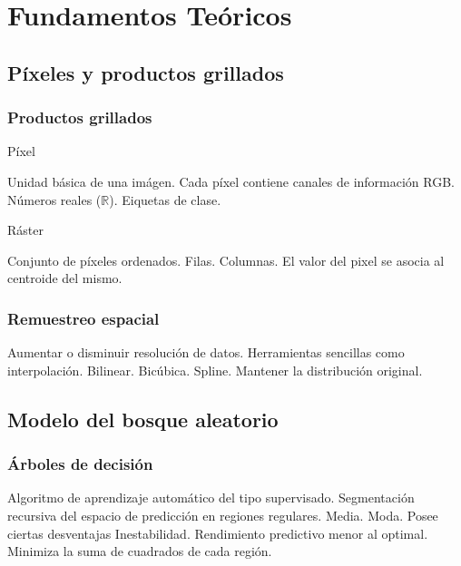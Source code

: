 \documentclass{beamer}
\begin{document}
  \section{Fundamentos Teóricos}

  \subsection*{Píxeles y productos grillados}

  \begin{frame}
    \frametitle{Productos grillados}

    \begin{block}{Píxel}
      \begin{outline}
        \1 Unidad básica de una imágen.
        \1 Cada píxel contiene canales de información
          \2 RGB.
          \2 Números reales ($\mathbb{R}$).
          \2 Eiquetas de clase.
      \end{outline}
    \end{block}

    \begin{block}{Ráster}
      \begin{outline}
        \1 Conjunto de píxeles ordenados.
          \2 Filas.
          \2 Columnas.
        \1 El valor del pixel se asocia al centroide del mismo.
      \end{outline}
    \end{block}
  \end{frame}

  \begin{frame}
    \frametitle{Remuestreo espacial}
    \begin{outline}
      \1 Aumentar o disminuir resolución de datos.
        \2 Herramientas sencillas como interpolación.
          \3 Bilinear.
          \3 Bicúbica.
          \3 Spline.
      \1 Mantener la distribución original.

    \end{outline}
  \end{frame}

  \subsection*{Modelo del bosque aleatorio}

  \begin{frame}
    \frametitle{Árboles de decisión}

    \begin{outline}
      \1  Algoritmo de aprendizaje automático del tipo supervisado.
      \1 Segmentación recursiva del espacio de predicción en regiones regulares.
        \2 Media. 
        \2 Moda.
      \1 Posee ciertas desventajas
        \2 Inestabilidad.
        \2 Rendimiento predictivo menor al optimal.
      \1 Minimiza la suma de cuadrados de cada región.
    \end{outline}
  \end{frame}
\end{document}
